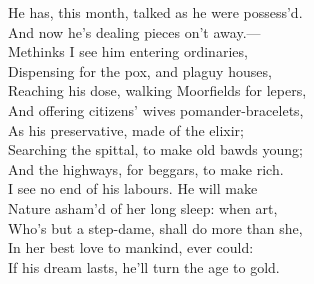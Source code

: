 \documentclass[a4paper,oneside]{memoir}
\begin{document}
\begin{drama*}
He has, this month, talked as he were possess'd.\\
And now he's dealing pieces on't away.---\\
Methinks I see him entering ordinaries,\\
Dispensing for the pox, and plaguy houses,\\
Reaching his dose, walking Moorfields for lepers,\\
And offering citizens' wives pomander-bracelets,\\
As his preservative, made of the elixir;\\
Searching the spittal, to make old bawds young;\\
And the highways, for beggars, to make rich.\\
I see no end of his labours. He will make\\
Nature asham'd of her long sleep: when art,\\
Who's but a step-dame, shall do more than she,\\
In her best love to mankind, ever could:\\
If his dream lasts, he'll turn the age to gold.\\
\act

\scene


\end{drama*}
\end{document}

